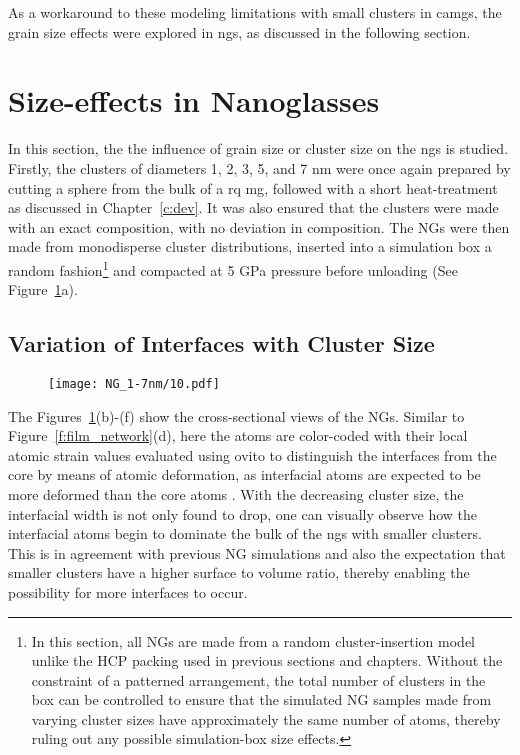 As a workaround to these modeling limitations with small clusters in \gls{camg}s, the grain size effects were explored in \gls{ng}s, as discussed in the following section.

\section{Size-effects in Nanoglasses}
In this section, the the influence of grain size or cluster size on the \gls{ng}s is studied. Firstly, the clusters of diameters 1, 2, 3, 5, and 7 nm were once again prepared by cutting a sphere from the bulk of a  \gls{rq} \gls{mg}, followed with a short heat-treatment as discussed in Chapter~\ref{c:dev}. It was also ensured that the clusters were made with an exact \cz composition, with no deviation in composition. The NGs were then made from monodisperse cluster distributions, inserted into a simulation box a random fashion\footnote{In this section, all NGs are made from a random cluster-insertion model unlike the HCP packing used in previous sections and chapters. Without the constraint of a patterned arrangement, the total number of clusters in the box can be controlled to ensure that the simulated NG samples made from varying cluster sizes have approximately the same number of atoms, thereby ruling out any possible simulation-box size effects.} and compacted at 5 GPa pressure before unloading (See Figure~\ref{f:NGintersiz}a).   \par

\subsection{Variation of Interfaces with Cluster Size}

\begin{figure}[!h]
	\texttt{[image: NG\_1-7nm/10.pdf]}
	\label{f:NGintersiz}
\end{figure}

The Figures~\ref{f:NGintersiz}(b)-(f) show the cross-sectional views of the NGs. Similar to Figure~\ref{f:film_network}(d), here the atoms are color-coded with their local atomic strain values evaluated using \gls{ovito} \cite{Stukowski2014} to distinguish the interfaces from the core by means of atomic deformation, as interfacial atoms are expected to be more deformed than the core atoms \cite{Gleiter1991}. With the decreasing cluster size, the interfacial width is not only found to drop, one can visually observe how the interfacial atoms begin to dominate the bulk of the \gls{ng}s with smaller clusters. This is in agreement with previous NG simulations \cite{Cheng2019a} and also the expectation that smaller clusters have a higher surface to volume ratio, thereby enabling the possibility for more interfaces to occur. \par

